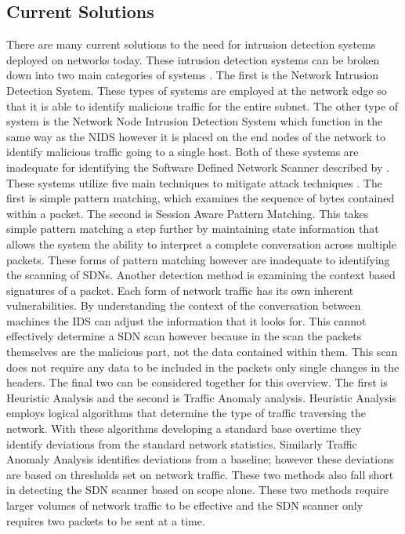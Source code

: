 \documentclass[twocolumn]{article}
\begin{document}
\subsection{Current Solutions}

There are many current solutions to the need for intrusion detection systems deployed on networks today. These intrusion detection systems can be broken down into two main categories of systems \cite{SANS}. The first is the Network Intrusion Detection System. These types of systems are employed at the network edge so that it is able to identify malicious traffic for the entire subnet. The other type of system is the Network Node Intrusion Detection System which function in the same way as the NIDS however it is placed on the end nodes of the network to identify malicious traffic going to a single host. Both of these systems are inadequate for identifying the Software Defined Network Scanner described by \cite{Gu13}. These systems utilize five main techniques to mitigate attack techniques \cite{CISCO}. The first is simple pattern matching, which examines the sequence of bytes contained within a packet. The second is Session Aware Pattern Matching. This takes simple pattern matching a step further by maintaining state information that allows the system the ability to interpret a complete conversation across multiple packets. These forms of pattern matching however are inadequate to identifying the scanning of SDNs. Another detection method is examining the context based signatures of a packet. Each form of network traffic has its own inherent vulnerabilities. By understanding the context of the conversation between machines the IDS can adjust the information that it looks for. This cannot effectively determine a SDN scan however because in the scan the packets themselves are the malicious part, not the data contained within them. This scan does not require any data to be included in the packets only single changes in the headers. The final two can be considered together for this overview. The first is Heuristic Analysis and the second is Traffic Anomaly analysis. Heuristic Analysis employs logical algorithms that determine the type of traffic traversing the network. With these algorithms developing a standard base overtime they identify deviations from the standard network statistics. Similarly Traffic Anomaly Analysis identifies deviations from a baseline; however these deviations are based on thresholds set on network traffic. These two methods also fall short in detecting the SDN scanner based on scope alone. These two methods require larger volumes of network traffic to be effective and the SDN scanner only requires two packets to be sent at a time. 
\end{document}
